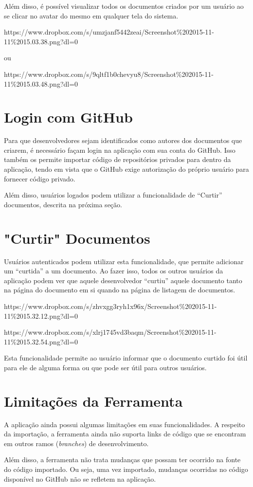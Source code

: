Além disso, é possível visualizar todos os documentos criados por um usuário ao se clicar no avatar do mesmo em qualquer tela do sistema.

https://www.dropbox.com/s/umzjanf5442zeai/Screenshot\%202015-11-11\%2015.03.38.png?dl=0

ou

https://www.dropbox.com/s/9qltf1b0chevyu8/Screenshot\%202015-11-11\%2015.03.48.png?dl=0

\section{Login com GitHub}

Para que desenvolvedores sejam identificados como autores dos documentos que criarem, é necessário façam login na aplicação com sua conta do GitHub. Isso também os permite importar código de repositórios privados para dentro da aplicação, tendo em vista que o GitHub exige autorização do próprio usuário para fornecer código privado.

Além disso, usuários logados podem utilizar a funcionalidade de ``Curtir'' documentos, descrita na próxima seção.

\section{"Curtir" Documentos}

Usuários autenticados podem utilizar esta funcionalidade, que permite adicionar um ``curtida'' a um documento. Ao fazer isso, todos os outros usuários da aplicação podem ver que aquele desenvolvedor ``curtiu'' aquele documento tanto na página do documento em si quando na página de listagem de documentos.

https://www.dropbox.com/s/zhvxgg3ryh1x96x/Screenshot\%202015-11-11\%2015.32.12.png?dl=0

https://www.dropbox.com/s/xlrj1745vd3baqm/Screenshot\%202015-11-11\%2015.32.54.png?dl=0

Esta funcionalidade permite ao usuário informar que o documento curtido foi útil para ele de alguma forma ou que pode ser útil para outros usuários.

\section{Limitações da Ferramenta}

A aplicação ainda possui algumas limitações em suas funcionalidades. A respeito da importação, a ferramenta ainda não suporta links de código que se encontram em outros ramos (\textit{branches}) de desenvolvimento.

Além disso, a ferramenta não trata mudanças que possam ter ocorrido na fonte do código importado. Ou seja, uma vez importado, mudanças ocorridas no código disponível no GitHub não se refletem na aplicação.





